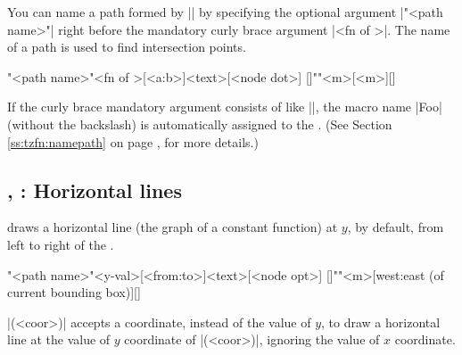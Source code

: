You can name a path formed by |\tzfn| by specifying the optional argument |"<path name>"| right before the mandatory curly brace argument |{<fn of \x>}|. The name of a path is used to find intersection points.

\begin{tzdef}{}
\tzfn[<opt>]"<path name>"{<fn of \x>}[<a:b>]{<text>}[<node dot>]
  []""{<m>}[<m>]{}[]
\end{tzdef}

\begin{tzcode}{.3}
\end{tzcode}

\remark
If the curly brace mandatory argument consists of  like |{\Foo}|, the macro name |Foo| (without the backslash) is automatically assigned to the . (See Section \ref{ss:tzfn:namepath} on page \pageref{ss:tzfn:namepath}, for more details.)

\subsection{\protect\cmd{\tzhfnat}, \protect\cmd{\tzhfn}: Horizontal lines}
\label{ssi:tzhfn}

\icmd{\tzhfnat} draws a horizontal line (the graph of a constant function) at $y$, by default, from left to right of the .

\begin{tzdef}{}
\tzhfnat[<opt>]"<path name>"{<y-val>}[<from:to>]{<text>}[<node opt>]
  []""{<m>}[west:east (of current bounding box)]{}[]
\end{tzdef}

\icmd{\tzhfn}|(<coor>)| accepts a coordinate, instead of the value of $y$, to draw a horizontal line at the value of $y$ coordinate of |(<coor>)|, ignoring the value of $x$ coordinate.

\begin{tzcode}{.3}
\end{tzcode}


